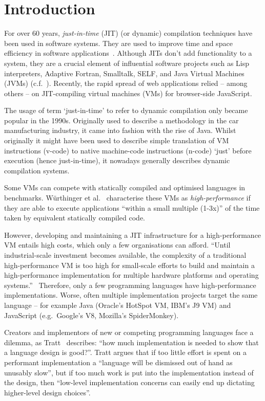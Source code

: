 
\section{Introduction}

For over 60 years, \emph{just-in-time} (JIT) (or dynamic) compilation techniques
have been used in software systems. They are used to improve time and space
efficiency in software applications~\cite{aycock2003brief}. Although JITs don't
add functionality to a system, they are a crucial element of influential
software projects such as Lisp interpreters, Adaptive Fortran, Smalltalk, SELF,
and Java Virtual Machines (JVMs) (c.f.~\cite{arnold2005survey}). Recently, the
rapid spread of web applications relied -- among others -- on JIT-compiling
virtual machines (VMs) for browser-side JavaScript.

The usage of term `just-in-time' to refer to dynamic compilation only became
popular in the 1990s. Originally used to describe a methodology in the car
manufacturing industry, it came into fashion with the rise of Java. Whilst
originally it might have been used to describe simple translation of VM
instructions (v-code) to native machine-code instructions (n-code) `just' before
execution (hence just-in-time), it nowadays generally describes dynamic
compilation systems.

Some VMs can compete with statically compiled and optimised languages in
benchmarks. W\"urthinger et al.~\cite{wurthinger2013one} characterise these VMs
as \emph{high-performance} if they are able to execute applications ``within a
small multiple (1-3x)'' of the time taken by equivalent statically compiled
code.

However, developing and maintaining a JIT infrastructure for a high-performance
VM entails high costs, which only a few organisations can afford. ``Until
industrial-scale investment becomes available, the complexity of a traditional
high-performance VM is too high for small-scale efforts to build and maintain a
high-performance implementation for multiple hardware platforms and operating
systems.''~\cite{wurthinger2013one}
Therefore, only a few programming languages have high-performance
implementations. Worse, often multiple implementation projects target the same
language -- for example Java (Oracle's HotSpot VM, IBM's J9 VM) and JavaScript
(e.g.~Google's V8, Mozilla's SpiderMonkey).

Creators and implementors of new or competing programming languages face a
dilemma, as Tratt~\cite{tratt_fast_enough} describes: ``how much implementation
is needed to show that a language design is good?''. Tratt argues that if too
little effort is spent on a performant implementation a ``language will be
dismissed out of hand as unusably slow'', but if too much work is put into the
implementation instead of the design, then ``low-level implementation concerns
can easily end up dictating higher-level design choices''.

